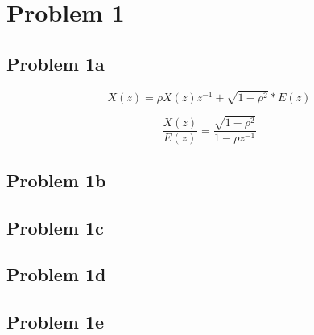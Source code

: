 \chapter{Problem 1}
  \section{Problem 1a}
  
	\begin{equation}
		X(z)=\rho X(z)z^{-1}+\sqrt{1-\rho ^2}*E(z) 
	\end{equation}
	
	\begin{equation}
		\frac{X(z)}{E(z)}=\frac{\sqrt{1-\rho ^2}}{1-\rho z^{-1}}
	\end{equation}
  
  \section{Problem 1b}
  
  
  \section{Problem 1c}
  
  
  
  \section{Problem 1d}
  
  
  \section{Problem 1e}